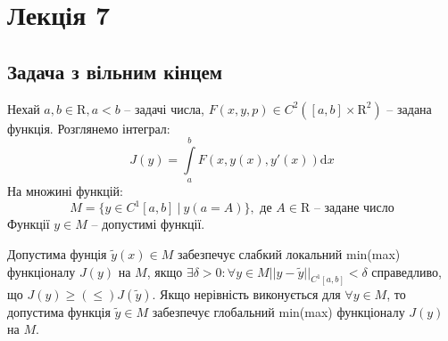 \documentclass[14pt,a4paper]{scrartcl}
\theoremstyle{definition}
\theoremstyle{definition}
\theoremstyle{definition}
\begin{document}
\newpage

\section{Лекція 7}
\subsection{Задача з вільним кінцем}
Нехай $a, b \in \mathrm{R}, a < b$ -- задачі числа, $F(x, y, p) \in C^2([a, b] \times \mathrm{R}^2)$ -- задана функція. Розглянемо інтеграл: $$J(y) = \int\limits_{a}^{b}F(x, y(x), y'(x))\mathrm{d}x$$
На множині функцій: $$ M = \{ y \in C^1[a, b] \ | \ y(a = A)\}, \text{ де } A \in \mathrm{R} \text{ -- задане число} $$
Функції $y \in M$ -- допустимі функції.

 Допустима фунція $\tilde{y}(x) \in M$ забезпечує слабкий локальний min(max) функціоналу $J(y)$ на $M$, якщо $\exists \delta > 0 : \forall y \in M ||y - \tilde{y}||_{C^1[a, b]} < \delta$ справедливо, що $J(y) \geq (\leq) J(\tilde{y})$. Якщо нерівність виконується для $\forall y \in M$, то допустима функція $\tilde{y} \in M$ забезпечує глобальний min(max) функціоналу $J(y)$ на $M$.
\end{document}
